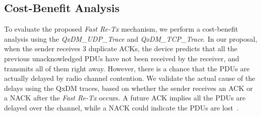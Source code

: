 
\subsection{Cost-Benefit Analysis}


To evaluate the proposed \textit{Fast Re-Tx} mechanism, we perform a cost-benefit analysis using the \emph{QxDM\_{}UDP\_{}Trace} and \emph{QxDM\_{}TCP\_{}Trace}. In our proposal, when the sender receives 3 duplicate ACKs, the device predicts that all the previous unacknowledged PDUs have not been received by the receiver, and transmits all of them right away. However, there is a chance that the PDUs are actually delayed by radio channel contention. We validate the actual cause of the delays using the QxDM traces, based on whether the sender receives an ACK or a NACK after the \textit{Fast Re-Tx} occurs. A future ACK implies all the PDUs are delayed over the channel, while a NACK could indicate the PDUs are lost~\cite{spec-3G-RLC}.

